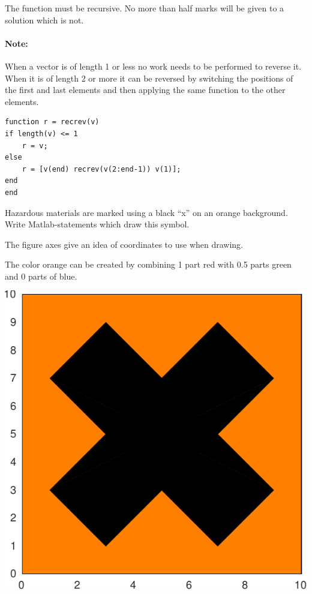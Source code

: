 \documentclass[addpoints]{exam}
\begin{document}
\begin{questions}
The function must be recursive. No more than half marks will be given to a solution which is not.

\paragraph{Note:} When a vector is of length 1 or less no work needs to be performed to reverse it. When it is of length 2 or more it can be reversed by switching the positions of the first and last elements and then applying the same function to the other elements.

\begin{solution}
\begin{verbatim}
function r = recrev(v)
if length(v) <= 1
    r = v;
else
    r = [v(end) recrev(v(2:end-1)) v(1)];
end
end
\end{verbatim}    
\end{solution}

\newpage

\question[10]

\begin{multicols}{2}
Hazardous materials are marked using a black ``x'' on an orange background. Write Matlab-statements which draw this symbol.

The figure axes give an idea of coordinates to use when drawing.

The color orange can be created by combining 1 part red with 0.5 parts green and 0 parts of blue.

\begin{center}
    \includegraphics[width=0.8\linewidth]{Pics/haettulegtheilsu}
\end{center}


\end{multicols}
\end{questions}
\end{document}

